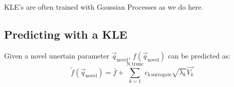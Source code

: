 \noindent KLE's are often trained with Gaussian Processes as we do here.

\subsection{Predicting with a KLE}
Given a novel unertain parameter $\vec{q}_{\text{novel}}$, $f(\vec{q}_{\text{novel}})$ can be predicted as:
$$
\tilde{f}(\vec{q}_{\text{novel}}) = \bar{f} + \sum_{k=1}^{\text{N\_trunc}} c_{k\,\text{surrogate}} \sqrt{\lambda_k} \vec{V_k}
$$